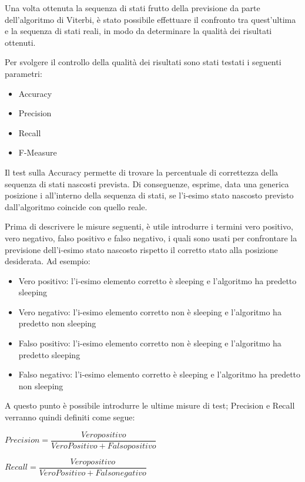 \documentclass[10pt,a4paper]{article}
\begin{document}
	Una volta ottenuta la sequenza di stati frutto della previsione da parte dell'algoritmo di Viterbi, è stato possibile effettuare il confronto tra quest'ultima e la sequenza di stati reali, in modo da determinare la qualità dei risultati ottenuti.

	Per svolgere il controllo della qualità dei risultati sono stati testati i seguenti parametri:

	\begin{itemize}
		\item Accuracy
		\item Precision
		\item Recall
		\item F-Measure
	\end{itemize}

	Il test sulla Accuracy permette di trovare la percentuale di correttezza della sequenza di stati nascosti prevista. Di conseguenze, esprime, data una generica posizione i all'interno della sequenza di stati, se l'i-esimo stato nascosto previsto dall'algoritmo coincide con quello reale.

	Prima di descrivere le misure seguenti, è utile introdurre i termini vero positivo, vero negativo, falso positivo e falso negativo, i quali sono usati per confrontare la previsione dell'i-esimo stato nascosto rispetto il corretto stato alla posizione desiderata. Ad esempio:

	\begin{itemize}
		\item Vero positivo: l'i-esimo elemento corretto è sleeping e l'algoritmo ha predetto sleeping
		\item Vero negativo: l'i-esimo elemento corretto non è sleeping e l'algoritmo ha predetto non sleeping
		\item Falso positivo: l'i-esimo elemento corretto non è sleeping e l'algoritmo ha predetto sleeping
		\item Falso negativo: l'i-esimo elemento corretto è sleeping e l'algoritmo ha predetto non sleeping
	\end{itemize}

	A questo punto è possibile introdurre le ultime misure di test; Precision e Recall verranno quindi definiti come segue:

	\begin{center}
		$ Precision = \dfrac{Veropositivo}{VeroPositivo + Falsopositivo} $
	\end{center}

	\begin{center}
		$ Recall = \dfrac{Veropositivo}{VeroPositivo + Falsonegativo} $
	\end{center}
\end{document}
